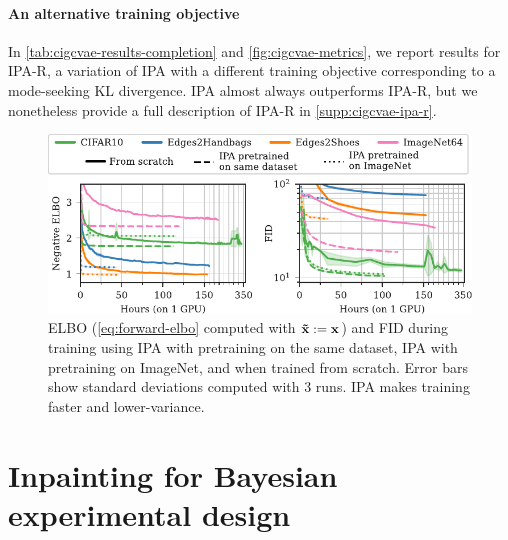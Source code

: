 \paragraph{An alternative training objective}
In \cref{tab:cigcvae-results-completion} and \cref{fig:cigcvae-metrics}, we report results for
IPA-R, a variation of IPA with a different training objective corresponding to a
mode-seeking KL divergence. IPA almost always outperforms IPA-R, but we
nonetheless provide a full description of IPA-R in \cref{supp:cigcvae-ipa-r}.

\begin{figure}[t]
  \vspace{-.1cm}
  \centering
  \includegraphics[scale=1]{figs/cigcvae/training-both}
  \caption{ELBO (\cref{eq:forward-elbo} computed with $\mathbf{\tilde{x}}{} := {\mathbf{x}}$) and
    FID during training using IPA with pretraining on the same dataset, IPA with
    pretraining on ImageNet, and when trained from scratch. Error bars show
    standard deviations computed with 3 runs. IPA makes training faster and
    lower-variance.}
  \label{fig:cigcvae-training}
  \vspace{-.3cm}
\end{figure}




\section{Inpainting for Bayesian experimental design} \label{sec:cigcvae-boed}

